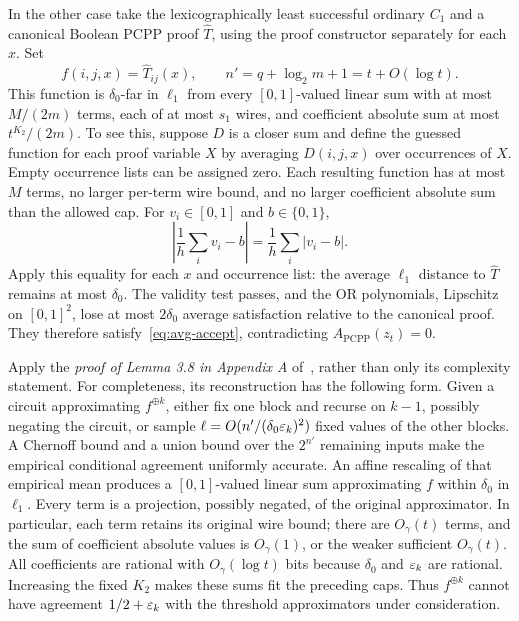 In the other case take the lexicographically least successful ordinary $C_1$
and a canonical Boolean PCPP proof $\widehat T$, using the proof
constructor separately for each $x$. Set
\[
 f(i,j,x)=\widehat T_{ij}(x),\qquad
 n'=q+\log_2m+1=t+O(\log t).
\]
This function is $\delta_0$-far in $\ell_1$ from every $[0,1]$-valued
linear sum with at most $M/(2m)$ terms, each of at most $s_1$ wires,
and coefficient absolute sum at most $t^{K_2}/(2m)$. To see this,
suppose $D$ is a closer sum and define the guessed function for each
proof variable $X$ by averaging $D(i,j,x)$ over occurrences of $X$.
Empty occurrence lists can be assigned zero. Each resulting function
has at most $M$ terms, no larger per-term wire bound, and no larger
coefficient absolute sum than the allowed cap. For $v_i\in[0,1]$
and $b\in\{0,1\}$,
\[
 \left|\frac1h\sum_i v_i-b\right|=
 \frac1h\sum_i|v_i-b|.
\]
Apply this equality for each $x$ and occurrence list: the average
$\ell_1$ distance to $\widehat T$ remains at most $\delta_0$.
The validity test passes, and the OR polynomials, Lipschitz on
$[0,1]^2$, lose at most $2\delta_0$ average satisfaction relative
to the canonical proof. They therefore satisfy~\eqref{eq:avg-accept},
contradicting $A_{\mathrm{PCPP}}(z_t)=0$.

Apply the \emph{proof of Lemma 3.8 in Appendix A} of~\cite{CLW20},
rather than only its complexity statement. For completeness, its
reconstruction has the following form. Given a circuit approximating
$f^{\oplus k}$, either fix one block and recurse on $k-1$, possibly
negating the circuit, or sample
$\ell=O(n'/(\delta_0\varepsilon_k)^2)$ fixed values of the other blocks.
A Chernoff bound and a union bound over the $2^{n'}$ remaining inputs
make the empirical conditional agreement uniformly accurate. An
affine rescaling of that empirical mean produces a $[0,1]$-valued
linear sum approximating $f$ within $\delta_0$ in $\ell_1$.
Every term is a projection, possibly negated, of the original
approximator. In particular, each term retains its original wire
bound; there are $O_\gamma(t)$ terms, and the sum of coefficient
absolute values is $O_\gamma(1)$, or the weaker sufficient
$O_\gamma(t)$. All coefficients are rational with $O_\gamma(\log t)$
bits because $\delta_0$ and $\varepsilon_k$ are rational. Increasing the
fixed $K_2$ makes these sums fit the preceding caps. Thus
$f^{\oplus k}$ cannot have agreement $1/2+\varepsilon_k$ with the
threshold approximators under consideration.

